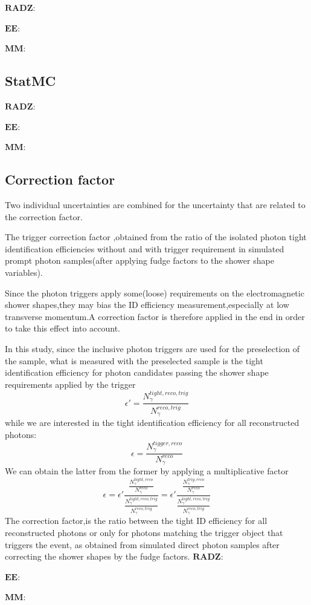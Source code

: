 \documentclass{ctexart}
\begin{document}
$\mathbf{RADZ}$:
\par$\mathbf{EE}$:
\par$\mathbf{MM}$:
\subsection{StatMC}
$\mathbf{RADZ}$:
\par$\mathbf{EE}$:
\par$\mathbf{MM}$:
\subsection{Correction factor}
Two individual uncertainties are combined for the uncertainty that are related to the correction factor.\par
The trigger correction factor ,obtained from the ratio of the isolated photon tight identification efficiencies without and with trigger requirement in simulated prompt photon samples(after applying fudge factors to the shower shape variables). \par
Since the photon triggers apply some(loose) requirements on the electromagnetic shower shapes,they may bias the ID efficiency measurement,especially at low transverse momentum.A correction factor is therefore applied in the end in order to take this effect into account. \par
In this study, since the inclusive photon triggers are used for the preselection of the sample, what
is measured with the preselected sample is the tight identification efficiency for photon candidates passing
the shower shape requirements applied by the trigger
$$\epsilon '=\frac{N_\gamma^{tight,reco,trig}}{N_\gamma^{reco,trig}}$$
while we are interested in the tight identification efficiency for all reconstructed photons:
$$\epsilon=\frac{N_\gamma^{tigger,reco}}{N_\gamma^{reco}}$$
We can obtain the latter from the former by applying a multiplicative factor
$$\epsilon=\epsilon'\frac{\frac{N_\gamma^{tight,reco}}{N_\gamma^{reco}}}{\frac{N_\gamma^{tight,reco,trig}}{N_\gamma^{reco,trig}}}=\epsilon'\frac{\frac{N_\gamma^{trig,reco}}{N_\gamma^{reco}}}{\frac{N_\gamma^{tight,reco,trig}}{N_\gamma^{reco,trig}}}$$
The correction factor,is the ratio between the tight ID efficiency for all reconstructed photons or only for photons matching the trigger object that triggers the event, as obtained  from simulated direct photon samples after correcting the shower shapes by the fudge factors.
$\mathbf{RADZ}$:
\par$\mathbf{EE}$:
\par$\mathbf{MM}$:
\end{document}
